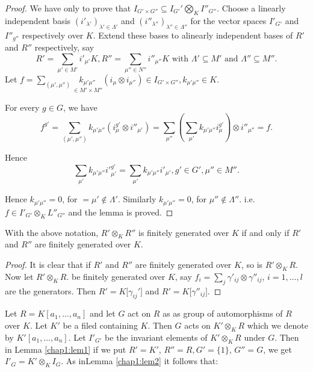 \begin{proof}
We have only to prove  that  $I_{G'\times G''} \subseteq  I_{G'}'
\bigotimes\limits_K I''_{G''}$. Choose a linearly independent  basis 
$(i'_{\lambda'})_{\lambda ' \in  \Lambda'}$ and
$(i''_{\lambda''})_{\lambda''\in \Lambda''}$ for  the vector  spaces
$I'_{G'}$ and    $I''_{g''}$ respectively over  $K$. Extend  these
bases to a\pageoriginale linearly independent bases of $R'$ and $R''$
respectively, say  
$$ 
R' = \sum_{\mu '\in M'} i'_{\mu'} K,R'' = \sum_{\mu''\in 
  N''} i''_{\mu''} K \text{ with } \Lambda' \subseteq  M' \text{ and }
\Lambda'' \subseteq  M''. 
$$
Let $f= \sum _{(\mu', \mu'')}  \underset{\in M' \times
  M''}{k_{\mu' \mu''}}   (i_\mu \otimes i_{\mu''}) \in  I_{G'\times G''}
, k_{\mu' \mu''} \in   K$.

For every $g \in G$, we  have
$$
f^{g'} = \sum_{(\mu' , \mu'')} k_{\mu' \mu''} (i^{g'}_\mu \otimes
i''_{\mu '})= \sum\limits_{\mu''} (\sum\limits_{\mu'} k_{\mu '\mu''}
i_\mu^{g'}) \otimes i''_{\mu''} =f. 
$$

Hence  
$$
\sum\limits_{\mu '}k_{\mu ' \mu''} i'^{ g'}_{\mu '} =
\sum\limits_{\mu '} k_{\mu ' \mu''} i'_{\mu'}, g' \in G', \mu'' \in
M''. 
$$

Hence  $k_{\mu'\mu''}=0$, for $=\mu'\notin \Lambda'$. Similarly 
$k_{\mu' \mu''}=0$, for ${\mu'' \notin \Lambda''}$. i.e. $f\in I'_{G'}
\otimes_K L''_{G''}$ and  the  lemma is proved.  
\end{proof}

\begin{lem}\label{chap1:lem2}%
With  the above notation, $R' \otimes_K R''$ is finitely generated
over $K$  if and   only  if $R'$  and  $R''$  are  finitely
generated over $K$. 
\end{lem}

\begin{proof}
It is  clear  that  if  $R'$ and $R''$ are finitely
  generated  over  $K$,  so is  $R' \otimes_K R$. Now  let  $R'
  \otimes_K R$. be finitely  generated over $K$,  say $f_i=
  \sum\limits_{j} \gamma'_{ij} \otimes \gamma''_{ij}$, $i=1, \ldots ,l$
  are the  generators. Then  $R' =K\bigg[\gamma_{ij}'\bigg]$ and $R'
  =K \bigg[\gamma''_{ij}\bigg]$. 
\end{proof}


Let  $R=K[a_1, \ldots ,a_n]$ and let $G$ act  on $R$ as as group of
automorphisms of $R$ over $K$. Let $K'$ be  a filed containing
$K$. Then $G$ acts on $K'\otimes_{K} R$ which we denote by $K'[a_1,
  \ldots , a_n]$. Let  $I'_{G'}$ be  the invariant elements  of $K'
\otimes_K R$ under $G$. Then  in Lemma \ref{chap1:lem1} if we put $R'=K'$,
$R''=R,G'=\{ 1 \}$, $G'' =G$, we get $I'_G =K' \otimes_K I_G$. As
in\pageoriginale Lemma \ref{chap1:lem2} it follows that:  

